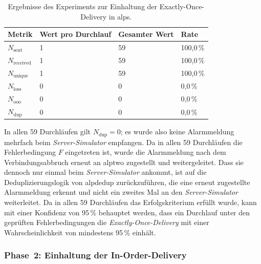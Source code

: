 \begin{table}[H]
    \centering
    \caption{Ergebnisse des Experiments zur Einhaltung der Exactly-Once-Delivery in \acrshort{alps}.}
    \label{tab:exp-alps-eod-results}
    \begin{tabular}{|l|l|l|l|}
        \hline
        \textbf{Metrik}       & \textbf{Wert pro Durchlauf} & \textbf{Gesamter Wert} & \textbf{Rate} \\
        \hline
        $N_{\text{sent}}$     & 1                           & 59                     & 100{,}0\,\%   \\
        $N_{\text{received}}$ & 1                           & 59                     & 100{,}0\,\%   \\
        $N_{\text{unique}}$   & 1                           & 59                     & 100{,}0\,\%   \\
        $N_{\text{loss}}$     & 0                           & 0                      & 0{,}0\,\%     \\
        $N_{\text{ooo}}$      & 0                           & 0                      & 0{,}0\,\%     \\
        $N_{\text{dup}}$      & 0                           & 0                      & 0{,}0\,\%     \\
        \hline
    \end{tabular}
\end{table}

In allen 59 Durchläufen gilt $N_{\text{dup}} = 0$; es wurde also keine Alarmmeldung mehrfach beim \textit{Server-Simulator} empfangen. Da in allen 59 Durchläufen die Fehlerbedingung $F$ eingetreten ist, wurde die Alarmmeldung nach dem Verbindungsabbruch erneut an \gls{alptwo} zugestellt und weitergeleitet. Dass sie dennoch nur einmal beim \textit{Server-Simulator} ankommt, ist auf die Deduplizierungslogik von \gls{alpdedup} zurückzuführen, die eine erneut zugestellte Alarmmeldung erkennt und nicht ein zweites Mal an den \textit{Server-Simulator} weiterleitet. Da in allen 59 Durchläufen das Erfolgskriterium erfüllt wurde, kann mit einer Konfidenz von 95\,\% behauptet werden, dass ein Durchlauf unter den geprüften Fehlerbedingungen die \textit{Exactly-Once-Delivery} mit einer Wahrscheinlichkeit von mindestens 95\,\% einhält.

\newpage

\subsubsection{Phase~2: Einhaltung der In-Order-Delivery}
\label{sub-sub:exp-alps-phase-2}

